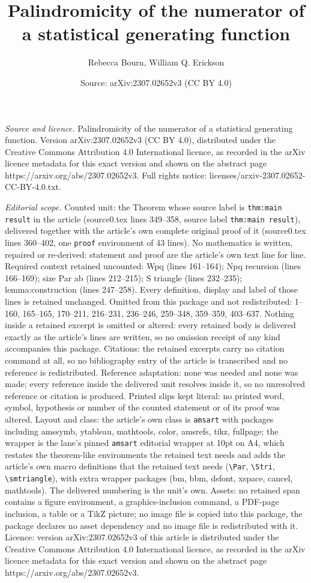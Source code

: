\documentclass[10pt,a4paper]{amsart}
\title[Palindromicity of the numerator of a statistical generating ]{Palindromicity of the numerator of a statistical generating function}
\author{Rebecca Bourn, William Q. Erickson}
\date{Source: arXiv:2307.02652v3 (CC BY 4.0)}
\begin{document}
\maketitle

\noindent\emph{Source and licence.} Palindromicity of the numerator of a statistical generating function. Version arXiv:2307.02652v3 (CC BY 4.0), distributed under the Creative Commons Attribution 4.0 International licence, as recorded in the arXiv licence metadata for this exact version and shown on the abstract page https://arxiv.org/abs/2307.02652v3. Full rights notice: licenses/arxiv-2307.02652-CC-BY-4.0.txt.\par\smallskip

\noindent\textit{Editorial scope.} Counted unit: the Theorem whose source label is \texttt{thm:main result} in the article (source0.tex lines 349--358, source label \texttt{thm:main result}), delivered together with the article's own complete original proof of it (source0.tex lines 360--402, one \texttt{proof} environment of 43 lines). No mathematics is written, repaired or re-derived: statement and proof are the article's own text line for line. Required context retained uncounted: Wpq (lines 161--164); Npq recursion (lines 166--169); size Par ab (lines 212--215); S triangle (lines 232--235); lemma:construction (lines 247--258). Every definition, display and label of those lines is retained unchanged. Omitted from this package and not redistributed: 1--160, 165--165, 170--211, 216--231, 236--246, 259--348, 359--359, 403--637. Nothing inside a retained excerpt is omitted or altered: every retained body is delivered exactly as the article's lines are written, so no omission receipt of any kind accompanies this package. Citations: the retained excerpts carry no citation command at all, so no bibliography entry of the article is transcribed and no reference is redistributed. Reference adaptation: none was needed and none was made; every reference inside the delivered unit resolves inside it, so no unresolved reference or citation is produced. Printed slips kept literal: no printed word, symbol, hypothesis or number of the counted statement or of its proof was altered. Layout and class: the article's own class is \texttt{amsart} with packages including amssymb, ytableau, mathtools, color, amsrefs, tikz, fullpage; the wrapper is the lane's pinned \texttt{amsart} editorial wrapper at 10pt on A4, which restates the theorem-like environments the retained text needs and adds the article's own macro definitions that the retained text needs (\texttt{\textbackslash Par}, \texttt{\textbackslash Stri}, \texttt{\textbackslash smtriangle}), with extra wrapper packages (bm, bbm, dsfont, xspace, cancel, mathtools). The delivered numbering is the unit's own. Assets: no retained span contains a figure environment, a graphics-inclusion command, a PDF-page inclusion, a table or a TikZ picture; no image file is copied into this package, the package declares no asset dependency and no image file is redistributed with it. Licence: version arXiv:2307.02652v3 of this article is distributed under the Creative Commons Attribution 4.0 International licence, as recorded in the arXiv licence metadata for this exact version and shown on the abstract page https://arxiv.org/abs/2307.02652v3. 
\end{document}

